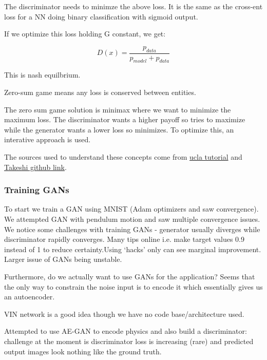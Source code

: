 \documentclass{article}
\begin{document}
%
%

The discriminator needs to minimze the above loss. It is the same as the cross-ent loss for a NN doing binary classification with sigmoid output.

If we optimize this loss holding G constant, we get:

$$ D(x) = \frac{p_{data}}{p_{model} + p_{data}} $$

This is nash equilbrium.

Zero-sum game means any loss is conserved between entities. 

The zero sum game solution is minimax where we want to minimize the maximum loss. The discriminator wants a higher payoff so tries to maximize while the generator wants a lower loss so minimizes. To optimize this, an interative approach is used.


The sources used to understand these concepts come from \href{https://seas.ucla.edu/~kao/nndl/lectures/gans.pdf}{ucla tutorial} and \href{https://danieltakeshi.github.io/2017/03/05/understanding-generative-adversarial-networks/}{Takeshi github link}.



\subsubsection*{Training GANs}

To start we  train a GAN using MNIST (Adam optimizers and saw convergence). We attempted GAN with pendulum motion and saw multiple convergence issues. We notice some challenges with training GANs - generator usually diverges while discriminator rapidly converges. Many tips online i.e. make target values 0.9 instead of 1 to reduce certainty.Using ‘hacks’ only can see marginal improvement. Larger issue of GANs being unstable.

Furthermore, do we actually want to use GANs for the application? Seems that the only way to constrain the noise input is to encode it which essentially gives us an autoencoder.

VIN network is a good idea though we have no code base/architecture used.

Attempted to use AE-GAN to encode physics and also build a discriminator: challenge at the moment is discriminator loss is increasing (rare) and predicted output images look nothing like the ground truth. 
\end{document}
